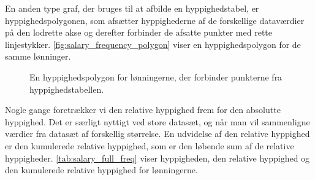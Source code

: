 En anden type graf, der bruges til at afbilde en hyppighedstabel, er hyppighedspolygonen, som
afsætter hyppighederne af de forskellige dataværdier på den lodrette akse og derefter forbinder de
afsatte punkter med rette linjestykker. \autoref{fig:salary_frequency_polygon} viser en hyppighedspolygon for de samme lønninger.

\begin{figure}[htbp]
\centering
{}
\caption{En hyppighedspolygon for lønningerne, der forbinder punkterne fra hyppighedstabellen.}
\label{fig:salary_frequency_polygon}
\end{figure}

Nogle gange foretrækker vi den relative hyppighed frem for den absolutte hyppighed. Det er særligt nyttigt ved store datasæt, og når man vil sammenligne værdier fra datasæt af forskellig størrelse. En udvidelse af den relative hyppighed er den kumulerede relative hyppighed, som er den løbende sum af de relative hyppigheder. \autoref{tab:salary_full_freq} viser hyppigheden, den relative hyppighed og den kumulerede relative hyppighed for lønningerne.

